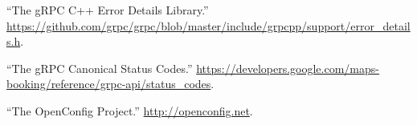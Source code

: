 \documentclass[11pt]{article}
\begin{document}
{{\begin{thebibliography}{35}
\mdbibitemlabel{{}[30]}\textquotedblleft{}The gRPC C++ Error Details Library.\textquotedblright{} \href{https://github.com/grpc/grpc/blob/master/include/grpcpp/support/error_details.h}{{\ttfamily https://\hspace{0pt}github.\hspace{0pt}com/\hspace{0pt}grpc/\hspace{0pt}grpc/\hspace{0pt}blob/\hspace{0pt}master/\hspace{0pt}include/\hspace{0pt}grpcpp/\hspace{0pt}support/\hspace{0pt}error\_\hspace{0pt}details.\hspace{0pt}h}}.\label{grpcerrordetails}%

\mdbibitemlabel{{}[31]}\textquotedblleft{}The gRPC Canonical Status Codes.\textquotedblright{} \href{https://developers.google.com/maps-booking/reference/grpc-api/status_codes}{{\ttfamily https://\hspace{0pt}developers.\hspace{0pt}google.\hspace{0pt}com/\hspace{0pt}maps-\hspace{0pt}booking/\hspace{0pt}reference/\hspace{0pt}grpc-\hspace{0pt}api/\hspace{0pt}status\_\hspace{0pt}codes}}.\label{grpcstatuscodes}%

\mdbibitemlabel{{}[32]}\textquotedblleft{}The OpenConfig Project.\textquotedblright{} \href{http://openconfig.net}{{\ttfamily http://\hspace{0pt}openconfig.\hspace{0pt}net}}.\label{openconfig}%


\end{thebibliography}}}
\end{document}
